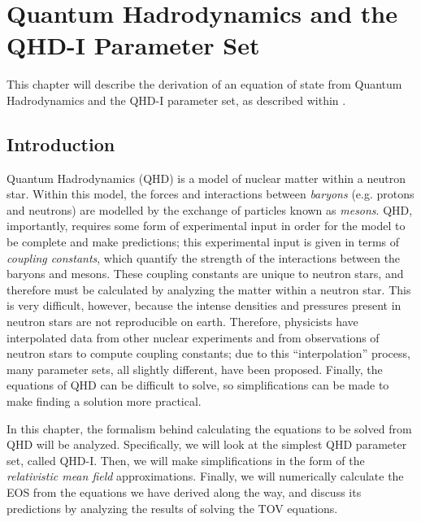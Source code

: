 \chapter{Quantum Hadrodynamics and the QHD-I Parameter Set}\label{ch: qhd1}

This chapter will describe the derivation of an equation of state from Quantum Hadrodynamics and the QHD-I parameter set, as described within \autocite{diener_2008}.

\section{Introduction}

Quantum Hadrodynamics (QHD) is a model of nuclear matter within a neutron star. Within this model, the forces and interactions between \textit{baryons} (e.g. protons and neutrons) are modelled by the exchange of particles known as \textit{mesons}. QHD, importantly, requires some form of experimental input in order for the model to be complete and make predictions; this experimental input is given in terms of \textit{coupling constants}, which quantify the strength of the interactions between the baryons and mesons. These coupling constants are unique to neutron stars, and therefore must be calculated by analyzing the matter within a neutron star. This is very difficult, however, because the intense densities and pressures present in neutron stars are not reproducible on earth. Therefore, physicists have interpolated data from other nuclear experiments and from observations of neutron stars to compute coupling constants; due to this ``interpolation'' process, many parameter sets, all slightly different, have been proposed. Finally, the equations of QHD can be difficult to solve, so simplifications can be made to make finding a solution more practical.

In this chapter, the formalism behind calculating the equations to be solved from QHD will be analyzed. Specifically, we will look at the simplest QHD parameter set, called QHD-I. Then, we will make simplifications in the form of the \textit{relativistic mean field} approximations. Finally, we will numerically calculate the EOS from the equations we have derived along the way, and discuss its predictions by analyzing the results of solving the TOV equations.


